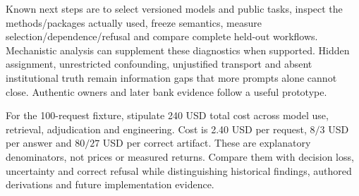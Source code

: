 Known next steps are to select versioned models and public tasks, inspect the methods/packages actually used, freeze semantics, measure selection/dependence/refusal and compare complete held-out workflows. Mechanistic analysis can supplement these diagnostics when supported. Hidden assignment, unrestricted confounding, unjustified transport and absent institutional truth remain information gaps that more prompts alone cannot close. Authentic owners and later bank evidence follow a useful prototype.~\citep{exec24_css_knowledge_reference}

For the 100-request fixture, stipulate 240 USD total cost across model use, retrieval, adjudication and engineering. Cost is 2.40 USD per request, $8/3$ USD per answer and $80/27$ USD per correct artifact. These are explanatory denominators, not prices or measured returns. Compare them with decision loss, uncertainty and correct refusal while distinguishing historical findings, authored derivations and future implementation evidence.~\citep{exec24_css_knowledge_reference}

